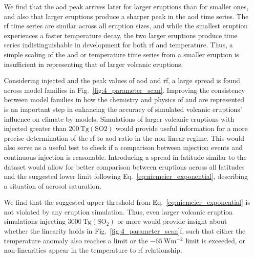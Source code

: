 \documentclass{ametsocV6.1}
\newcommand{\iso}[1][i]{{#1}njected \ce{SO2}}
\begin{document}
We find that the \gls{aod} peak arrives later for larger eruptions than for smaller
ones, and also that larger eruptions produce a sharper peak in the \gls{aod} time
series. The \gls{rf} time series are similar across all eruption sizes, and while the
smallest eruption experiences a faster temperature decay, the two larger eruptions
produce time series indistinguishable in development for both \gls{rf} and temperature.
Thus, a simple scaling of the \gls{aod} or temperature time series from a smaller
eruption is insufficient in representing that of larger volcanic eruptions.

Considering \iso{} and the peak values of \gls{aod} and \gls{rf}, a large spread is
found across model families in Fig.~\ref{fig:4_parameter_scan}. Improving the
consistency between model families in how the chemistry and physics of  and
 are represented is an important step in enhancing the accuracy of simulated
volcanic eruptions' influence on climate by models.
Simulations of larger volcanic eruptions with \iso{} greater than
\(\SI{200}{\tera\gram(\mathrm{SO2})}\) would provide useful information for a more
precise determination of the \gls{rf} to \gls{aod} ratio in the non-linear regime. This
would also serve as a useful test to check if a comparison between  injection
events and continuous  injection is reasonable. Introducing a spread in latitude
similar to the \citet{marshall2020dataset} dataset would allow for better comparison
between eruptions across all latitudes and the suggested lower limit following
Eq.~\ref{eq:niemeier_exponential}, describing a situation of aerosol saturation.

We find that the suggested upper threshold from Eq.~\ref{eq:niemeier_exponential} is not
violated by any eruption simulation. Thus, even larger volcanic eruption simulations
injecting \(\SI{3000}{\tera\gram(\mathrm{SO_2})}\) or more would provide insight about
whether the linearity holds in Fig.~\ref{fig:4_parameter_scan}f, such that either the
temperature anomaly also reaches a limit or the \(\SI{-65}{\watt\metre^{-2}}\) limit is
exceeded, or non-linearities appear in the temperature to \gls{rf} relationship.
\end{document}
